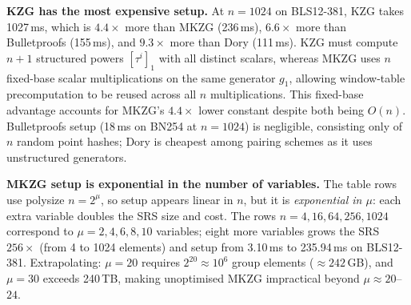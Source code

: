 \begin{table}[H]
\centering
\caption{Setup time (ms) at representative sizes. KZG: degree $n$;
MKZG: $\mu = \log_2 n$ variables; Bulletproofs/Dory: vector length $n$.}
\label{tab:setup-all}
%
\end{table}

\textbf{KZG has the most expensive setup.} At $n = 1024$ on BLS12-381,
KZG takes 1027\,ms, which is $4.4\times$ more than MKZG (236\,ms),
$6.6\times$ more than Bulletproofs (155\,ms), and $9.3\times$ more
than Dory (111\,ms). KZG must compute $n+1$ structured powers
$[\tau^i]_1$ with all distinct scalars, whereas MKZG uses $n$
fixed-base scalar multiplications on the same generator $g_1$,
allowing window-table precomputation to be reused across all $n$
multiplications. This fixed-base advantage accounts for MKZG's
$4.4\times$ lower constant despite both being $O(n)$.
Bulletproofs setup (18\,ms on BN254 at $n = 1024$) is negligible,
consisting only of $n$ random point hashes; Dory is cheapest among
pairing schemes as it uses unstructured generators.

\textbf{MKZG setup is exponential in the number of variables.}
The table rows use poly\-size $n = 2^{\mu}$, so setup appears linear
in $n$, but it is \emph{exponential in $\mu$}: each extra variable
doubles the SRS size and cost. The rows $n = 4, 16, 64, 256, 1024$
correspond to $\mu = 2, 4, 6, 8, 10$ variables; eight more variables
grows the SRS $256\times$ (from 4 to 1024 elements) and setup from
3.10\,ms to 235.94\,ms on BLS12-381. Extrapolating: $\mu = 20$
requires $2^{20} \approx 10^6$ group elements ($\approx 242$\,GB),
and $\mu = 30$ exceeds 240\,TB, making unoptimised MKZG impractical
beyond $\mu \approx 20$--$24$.

